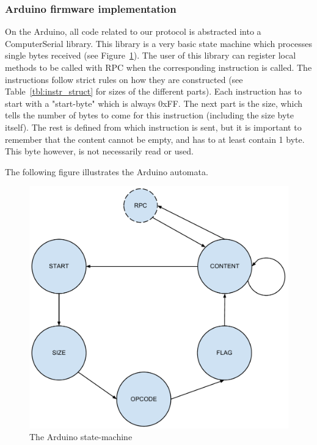 \subsubsection{Arduino firmware implementation}
On the Arduino, all code related to our protocol is abstracted into a ComputerSerial library.
This library is a very basic state machine which processes single bytes received (see Figure~\ref{fig:arduino_states}).
The user of this library can register local methods to be called with RPC when the corresponding instruction is called.
The instructions follow strict rules on how they are constructed (see Table~\ref{tbl:instr_struct} for sizes of the different parts).
Each instruction has to start with a "start-byte" which is always 0xFF. The next part is the size, which tells the number of bytes
to come for this instruction (including the size byte itself). The rest is defined from which instruction is sent, but it is important to
remember that the content cannot be empty, and has to at least contain 1 byte. This byte however, is not necessarily read or used.

The following figure illustrates the Arduino automata.

\begin{figure}[h!]
\centering
\includegraphics[width=\textwidth, keepaspectratio]{img/arduino_state-machine.pdf}
\caption{The Arduino state-machine}
\label{fig:arduino_states}
\end{figure}


